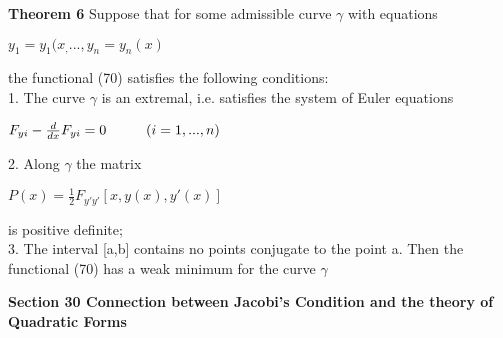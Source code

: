 \documentclass{article}
\newcommand\tab[1][1cm]{\hspace*{#1}}
\begin{document}
\textbf {Theorem 6} Suppose that for some admissible curve $\gamma$ with equations
\begin{center}
$y_1 = y_1(x_, ..., y_n = y_n(x)$
\end{center}
the functional (70) satisfies the following conditions: \\
1. The curve $\gamma$ is an extremal, i.e. satisfies the system of Euler equations
\begin{center}
$F_{yi} - \frac{d}{dx} F_{yi} = 0 \tab (i = 1,...,n)$
\end{center}
2. Along $\gamma$ the matrix
\begin{center}
$P(x) = \frac{1}{2} F_{y'y'} [x, y(x), y'(x)]$
\end{center}
is positive definite; \\
3. The interval [a,b] contains no points conjugate to the point a. Then the functional (70) has a weak minimum for the curve $\gamma$

\textbf {Section 30 Connection between Jacobi's Condition and the theory of Quadratic Forms}
\end{document}
